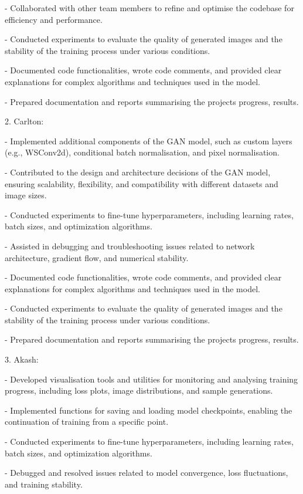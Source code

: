 \documentclass[
]{article}
\begin{document}
- Collaborated with other team members to refine and optimise the
codebase for efficiency and performance.

- Conducted experiments to evaluate the quality of generated images and
the stability of the training process under various conditions.

- Documented code functionalities, wrote code comments, and provided
clear explanations for complex algorithms and techniques used in the
model.

- Prepared documentation and reports summarising the
project\textquotesingle s progress, results.

2. Carlton:

- Implemented additional components of the GAN model, such as custom
layers (e.g., WSConv2d), conditional batch normalisation, and pixel
normalisation.

- Contributed to the design and architecture decisions of the GAN model,
ensuring scalability, flexibility, and compatibility with different
datasets and image sizes.

- Conducted experiments to fine-tune hyperparameters, including learning
rates, batch sizes, and optimization algorithms.

- Assisted in debugging and troubleshooting issues related to network
architecture, gradient flow, and numerical stability.

- Documented code functionalities, wrote code comments, and provided
clear explanations for complex algorithms and techniques used in the
model.

- Conducted experiments to evaluate the quality of generated images and
the stability of the training process under various conditions.

- Prepared documentation and reports summarising the
project\textquotesingle s progress, results.

3. Akash:

- Developed visualisation tools and utilities for monitoring and
analysing training progress, including loss plots, image distributions,
and sample generations.

- Implemented functions for saving and loading model checkpoints,
enabling the continuation of training from a specific point.

- Conducted experiments to fine-tune hyperparameters, including learning
rates, batch sizes, and optimization algorithms.

- Debugged and resolved issues related to model convergence, loss
fluctuations, and training stability.
\end{document}
